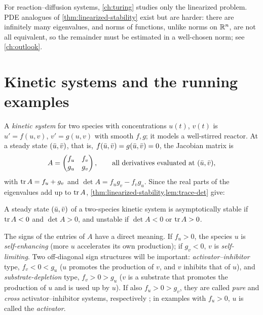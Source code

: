 \begin{remark}\label{rem:ode-pde}
For reaction--diffusion systems, \cref{ch:turing} studies only the linearized
problem. PDE analogues of \cref{thm:linearized-stability} exist but are harder:
there are infinitely many eigenvalues, and norms of functions, unlike norms on
$\mathbb{R}^n$, are not all equivalent, so the remainder must be estimated in a
well-chosen norm; see \cref{ch:outlook}.
\end{remark}

\section{Kinetic systems and the running examples}\label{sec:ode-kinetics}

A \emph{kinetic system} for two species with concentrations $u(t)$, $v(t)$ is
$u'=f(u,v)$, $v'=g(u,v)$ with smooth $f,g$; it models a well-stirred reactor.
At a steady state $(\bar u,\bar v)$, that is, $f(\bar u,\bar v)=g(\bar u,\bar v)=0$, the Jacobian matrix is
\begin{equation*}
  A=\begin{pmatrix} f_u & f_v\\ g_u & g_v\end{pmatrix},
  \qquad\text{all derivatives evaluated at } (\bar u,\bar v),
\end{equation*}
with $\operatorname{tr} A=f_u+g_v$ and $\det A=f_ug_v-f_vg_u$. Since the real parts of the
eigenvalues add up to $\operatorname{tr} A$, \cref{thm:linearized-stability,lem:trace-det} give:

\begin{keyidea}
A steady state $(\bar u,\bar v)$ of a two-species kinetic system is asymptotically
stable if $\operatorname{tr} A<0$ and $\det A>0$, and unstable if $\det A<0$ or $\operatorname{tr} A>0$.
\end{keyidea}

The signs of the entries of $A$ have a direct meaning. If $f_u>0$, the species
$u$ is \emph{self-enhancing} (more $u$ accelerates its own production); if
$g_v<0$, $v$ is \emph{self-limiting}. Two off-diagonal sign structures will be
important: \emph{activator--inhibitor} type, $f_v<0<g_u$ ($u$
promotes the production of $v$, and $v$ inhibits that of $u$), and
\emph{substrate-depletion} type, $f_v>0>g_u$ ($v$ is a substrate that promotes the
production of $u$ and is used up by $u$). If also $f_u>0>g_v$, they are called
\emph{pure} and \emph{cross} activator--inhibitor systems, respectively
\cite{Murray2003}; in
examples with $f_u>0$, $u$ is called the \emph{activator}.

